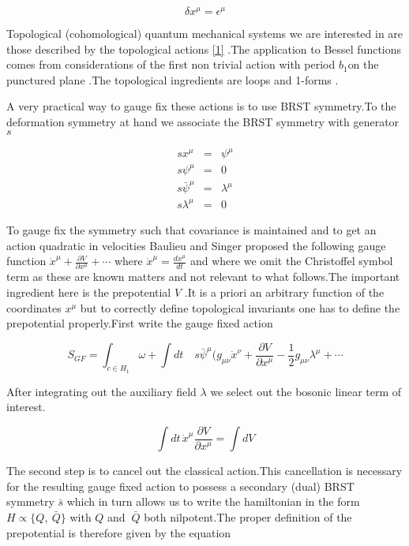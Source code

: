 \documentclass[a4paper,11pt]{article}
\begin{document}
\[
\delta x^{\mu }=\epsilon ^{\mu } 
\]

Topological (cohomological) quantum mechanical systems we are interested in
are those described by the topological actions \ref{1} .The application to
Bessel functions comes from considerations of the first non trivial action
with period $b_{1}$on the punctured plane .The topological ingredients are
loops and 1-forms .

A very practical way to gauge fix these actions is to use BRST symmetry.To
the deformation symmetry at hand we associate the BRST symmetry with
generator $s$

\begin{eqnarray*}
sx^{\mu } &=&\psi ^{\mu } \\
s\psi ^{\mu } &=&0 \\
s\bar{\psi}^{\mu } &=&\lambda ^{\mu } \\
s\lambda ^{\mu } &=&0
\end{eqnarray*}

To gauge fix the symmetry such that covariance is maintained and to get an
action quadratic in velocities Baulieu and Singer proposed the following
gauge function $\dot{x}^{\mu }+\frac{\partial V}{\partial x^{\mu }}+\cdots $
where $\dot{x}^{\mu }=\frac{dx^{\mu }}{dt}$ and where we omit the
Christoffel symbol term as these are known matters and not relevant to what
follows.The important ingredient here is the prepotential $V$ .It is a
priori an arbitrary function of the coordinates $x^{\mu }$ but to correctly
define topological invariants one has to define the prepotential
properly.First write the gauge fixed action

\begin{equation}
S_{GF}=\int_{c\in H_{1}}\omega +\int dt\!\quad \!\!s\bar{\psi}^{\mu }(g_{\mu
\nu }\dot{x}^{\nu }+\frac{\partial V}{\partial x^{\mu }}-\frac{1}{2}g_{\mu
\nu }\lambda ^{\mu }+\cdots  \label{4}
\end{equation}

After integrating out the auxiliary field $\lambda $ we select out the
bosonic linear term of interest.

\[
\int dt\,\dot{x}^{\mu }\frac{\partial V}{\partial x^{\mu }}=\int dV 
\]

The second step is to cancel out the classical action.This cancellation is
necessary for the resulting gauge fixed action to possess a secondary (dual)
BRST symmetry $\bar{s}$ which in turn allows us to write the hamiltonian in
the form $H\propto \{Q,\ \bar{Q}\}$ with $Q$ and $\ \bar{Q}$ both
nilpotent.The proper definition of the prepotential is therefore given by
the equation
\end{document}
